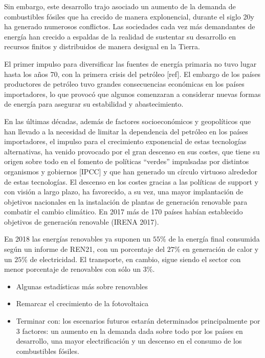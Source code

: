 Sin embargo, este desarrollo trajo asociado un aumento de la demanda de combustibles fósiles que ha crecido de manera explonencial, durante el siglo 20y ha generado numerosos conflictos. Las sociedades cada vez más demandantes de energía han crecido a espaldas de la realidad de sustentar su desarrollo en recursos finitos y distribuidos de manera desigual en la Tierra.

El primer impulso para diversificar las fuentes de energía primaria no tuvo lugar hasta los años 70, con la primera crisis del petróleo [ref]. El embargo de los países productores de petróleo tuvo grandes consecuencias económicas en los países importadores, lo que provocó que algunos comenzaran a considerar nuevas formas de energía para asegurar su estabilidad y abastecimiento.

En las últimas décadas, además de factores socioeconómicos y geopolíticos que han llevado a la necesidad de limitar la dependencia del petróleo en los países importadores, el impulso para el crecimiento exponencial de estas tecnologías alternativas, ha venido provocado por el gran descenso en sus costes, que tiene su origen sobre todo en el fomento de políticas ``verdes'' impulsadas por distintos organismos y gobiernos [IPCC] y que han generado un círculo virtuoso alrededor de estas tecnologías. El descenso en los costes gracias a las políticas de support y con visión a largo plazo, ha favorecido, a su vez, una mayor implantación de objetivos nacionales en la instalación de plantas de generación renovable para combatir el cambio climático. En 2017 más de 170 países habían establecido objetivos de generación renovable (IRENA 2017).

En 2018 las energías renovables ya suponen un $55\%$ de la energía final consumida según un informe de REN21, con un porcentaje del $27\%$ en generación de calor y un $25\%$ de electricidad. El transporte, en cambio, sigue siendo el sector con menor porcentaje de renovables con sólo un $3\%$. 

\begin{itemize}
\item Algunas estadísticas más sobre renovables  
\item Remarcar el crecimiento de la fotovoltaica
\item Terminar con: los escenarios futuros estarán determinados principalmente por 3 factores: un aumento en la demanda dada sobre todo por los países en desarrollo, una mayor electrificación y un descenso en el consumo de los combustibles fósiles.  
\end{itemize}


